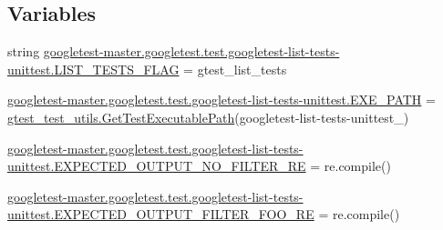 \subsection*{Variables}
\begin{DoxyCompactItemize}
\item 
string \mbox{\hyperlink{namespacegoogletest-master_1_1googletest_1_1test_1_1googletest-list-tests-unittest_a1fc50bb80c982c875ae47d93a09f6c6c}{googletest-\/master.\+googletest.\+test.\+googletest-\/list-\/tests-\/unittest.\+L\+I\+S\+T\+\_\+\+T\+E\+S\+T\+S\+\_\+\+F\+L\+AG}} = \textquotesingle{}gtest\+\_\+list\+\_\+tests\textquotesingle{}
\item 
\mbox{\hyperlink{namespacegoogletest-master_1_1googletest_1_1test_1_1googletest-list-tests-unittest_a578d4b43336c63ddfe7372fabbf0beec}{googletest-\/master.\+googletest.\+test.\+googletest-\/list-\/tests-\/unittest.\+E\+X\+E\+\_\+\+P\+A\+TH}} = \mbox{\hyperlink{namespacegtest__test__utils_a89ed3717984a80ffbb7a9c92f71b86a2}{gtest\+\_\+test\+\_\+utils.\+Get\+Test\+Executable\+Path}}(\textquotesingle{}googletest-\/list-\/tests-\/unittest\+\_\+\textquotesingle{})
\item 
\mbox{\hyperlink{namespacegoogletest-master_1_1googletest_1_1test_1_1googletest-list-tests-unittest_a1ea7524467c274ebb1f57890e68319ad}{googletest-\/master.\+googletest.\+test.\+googletest-\/list-\/tests-\/unittest.\+E\+X\+P\+E\+C\+T\+E\+D\+\_\+\+O\+U\+T\+P\+U\+T\+\_\+\+N\+O\+\_\+\+F\+I\+L\+T\+E\+R\+\_\+\+RE}} = re.\+compile()
\item 
\mbox{\hyperlink{namespacegoogletest-master_1_1googletest_1_1test_1_1googletest-list-tests-unittest_a3e140519b8553ab7de9052c1b35491af}{googletest-\/master.\+googletest.\+test.\+googletest-\/list-\/tests-\/unittest.\+E\+X\+P\+E\+C\+T\+E\+D\+\_\+\+O\+U\+T\+P\+U\+T\+\_\+\+F\+I\+L\+T\+E\+R\+\_\+\+F\+O\+O\+\_\+\+RE}} = re.\+compile()
\end{DoxyCompactItemize}
